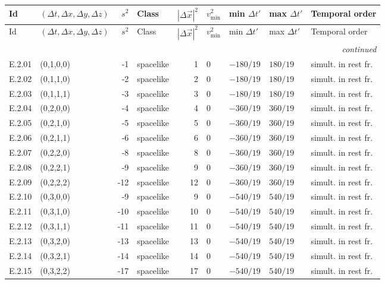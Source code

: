 {\scriptsize\setlength{\tabcolsep}{3pt}
\begin{longtable}{@{}llrlrllll@{}}
\toprule
Id & $(\Delta t,\Delta x,\Delta y,\Delta z)$ & $s^2$ & Class & $|\Delta\vec{x}|^2$ & $v^2_{\min}$ & min $\Delta t'$ & max $\Delta t'$ & Temporal order \\
\midrule\endfirsthead
\toprule
Id & $(\Delta t,\Delta x,\Delta y,\Delta z)$ & $s^2$ & Class & $|\Delta\vec{x}|^2$ & $v^2_{\min}$ & min $\Delta t'$ & max $\Delta t'$ & Temporal order \\
\midrule\endhead
\midrule\multicolumn{9}{r}{\emph{continued}}\\\endfoot
\bottomrule\endlastfoot
E.2.01 & (0,1,0,0) & -1 & spacelike & 1 & $0$ & $-180/19$ & $180/19$ & simult. in rest fr. \\
E.2.02 & (0,1,1,0) & -2 & spacelike & 2 & $0$ & $-180/19$ & $180/19$ & simult. in rest fr. \\
E.2.03 & (0,1,1,1) & -3 & spacelike & 3 & $0$ & $-180/19$ & $180/19$ & simult. in rest fr. \\
E.2.04 & (0,2,0,0) & -4 & spacelike & 4 & $0$ & $-360/19$ & $360/19$ & simult. in rest fr. \\
E.2.05 & (0,2,1,0) & -5 & spacelike & 5 & $0$ & $-360/19$ & $360/19$ & simult. in rest fr. \\
E.2.06 & (0,2,1,1) & -6 & spacelike & 6 & $0$ & $-360/19$ & $360/19$ & simult. in rest fr. \\
E.2.07 & (0,2,2,0) & -8 & spacelike & 8 & $0$ & $-360/19$ & $360/19$ & simult. in rest fr. \\
E.2.08 & (0,2,2,1) & -9 & spacelike & 9 & $0$ & $-360/19$ & $360/19$ & simult. in rest fr. \\
E.2.09 & (0,2,2,2) & -12 & spacelike & 12 & $0$ & $-360/19$ & $360/19$ & simult. in rest fr. \\
E.2.10 & (0,3,0,0) & -9 & spacelike & 9 & $0$ & $-540/19$ & $540/19$ & simult. in rest fr. \\
E.2.11 & (0,3,1,0) & -10 & spacelike & 10 & $0$ & $-540/19$ & $540/19$ & simult. in rest fr. \\
E.2.12 & (0,3,1,1) & -11 & spacelike & 11 & $0$ & $-540/19$ & $540/19$ & simult. in rest fr. \\
E.2.13 & (0,3,2,0) & -13 & spacelike & 13 & $0$ & $-540/19$ & $540/19$ & simult. in rest fr. \\
E.2.14 & (0,3,2,1) & -14 & spacelike & 14 & $0$ & $-540/19$ & $540/19$ & simult. in rest fr. \\
E.2.15 & (0,3,2,2) & -17 & spacelike & 17 & $0$ & $-540/19$ & $540/19$ & simult. in rest fr. \\

\end{longtable}}
